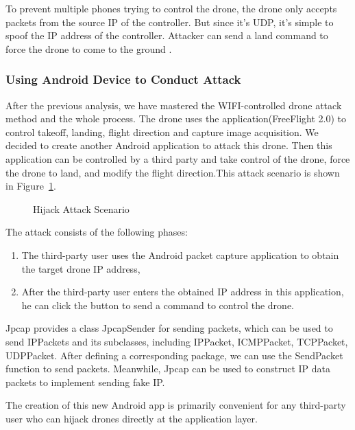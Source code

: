 \documentclass{acm_proc_article-sp}
\newcommand{\upcite}[1]{\textsuperscript{\textsuperscript{\cite{#1}}}}
\begin{document}
To prevent multiple phones trying to control the drone, the drone only accepts packets from the source IP of the controller. But since it's UDP, it's simple to spoof the IP address of the controller. Attacker can send a land command to force the drone to come to the ground\upcite{drone:python} .



\subsubsection{Using Android Device to Conduct Attack}

After the previous analysis, we have mastered the WIFI-controlled drone attack method and the whole process. The drone uses the application(FreeFlight 2.0) to control takeoff, landing, flight direction and capture image acquisition. We decided to create another Android application to attack this drone. Then this application can be controlled by a third party and take control of the drone, force the drone to land, and modify the flight direction.This attack scenario is shown in Figure~\ref{hijack}.

\begin{figure}
\centering
{}
\caption{Hijack Attack Scenario}
\label{hijack}
\end{figure}

The attack consists of the following phases:

\begin{enumerate}
  \item The third-party user uses the Android packet capture application to obtain the target drone IP address,
  \item After the third-party user enters the obtained IP address in this application, he can click the button to send a command to control the drone.
\end{enumerate}


Jpcap provides a class JpcapSender for sending packets, which can be used to send IPPackets and its subclasses, including IPPacket, ICMPPacket, TCPPacket, UDPPacket\cite{jpcap}. After defining a corresponding package, we can use the SendPacket function to send packets. Meanwhile, Jpcap can be used to construct IP data packets to implement sending fake IP.

The creation of this new Android app is primarily convenient for any third-party user who can hijack drones directly at the application layer.
\end{document}
